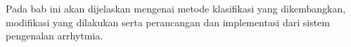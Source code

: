 \chapter{\babEmpat}
Pada bab ini akan dijelaskan mengenai metode klasifikasi yang dikembangkan,
modifikasi yang dilakukan serta perancangan dan implementasi dari sistem
pengenalan \gls{arrhytmia}. 

